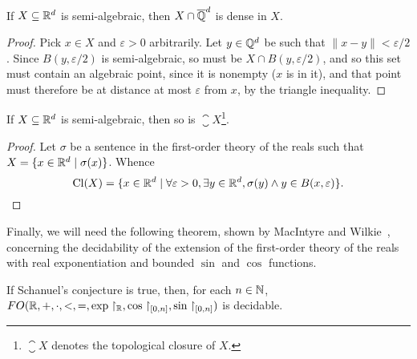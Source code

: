 \begin{lemma}
\label{lem:semi-alg-density}
If $X\subseteq\mathbb{R}^{d}$ is semi-algebraic, then $X\cap\overline{\mathbb{Q}}^{d}$ is dense in $X$.
\end{lemma}

\begin{proof}
  Pick $x\in X$ and $\varepsilon>0$ arbitrarily. Let
  $y\in\mathbb{Q}^{d}$ be such that $\| x-y \|<\varepsilon/2$. Since
  $B(y,\varepsilon/2)$ is semi-algebraic, so must be $X\cap
  B(y,\varepsilon/2)$, and so this set must contain an algebraic
  point, since it is nonempty ($x$ is in it), and that point must
  therefore be at distance at most $\varepsilon$ from $x$, by the
  triangle inequality.
\end{proof}

\begin{lemma}
\label{lem:semi-alg-closure}
If $X\subseteq\mathbb{R}^{d}$ is semi-algebraic, then so is $\closure{X}$\footnote{$\closure{X}$ denotes the topological closure of $X$.}.
\end{lemma}

\begin{proof}
  Let $\sigma$ be a sentence in the first-order theory of the reals such
  that $X=\lbrace x\in\mathbb{R}^{d}\mid \sigma(x)\rbrace$. Whence
\begin{equation*}
  \operatorname{Cl}(X)=\lbrace x\in\mathbb{R}^{d}\mid
\forall \varepsilon>0,\exists y\in\mathbb{R}^{d},\sigma(y)\wedge y\in B(x,\varepsilon) \rbrace .
\end{equation*}
\end{proof}

Finally, we will need the following theorem, shown by MacIntyre and Wilkie~\cite{WM}, concerning the decidability of the extension of the first-order theory of the reals with real exponentiation and bounded $\sin$ and $\cos$ functions.
\begin{theorem}
\label{thm:wilkie-macintyre}
  If Schanuel's conjecture is true, then, for each $n \in \mathbb{N}$,
  $FO(\mathbb{R}, +, \cdot, <, =, \exp \restriction_{\mathbb{R}}, \cos\restriction_{[0, n]}, \sin\restriction_{[0,n]})$ is decidable.
\end{theorem}
